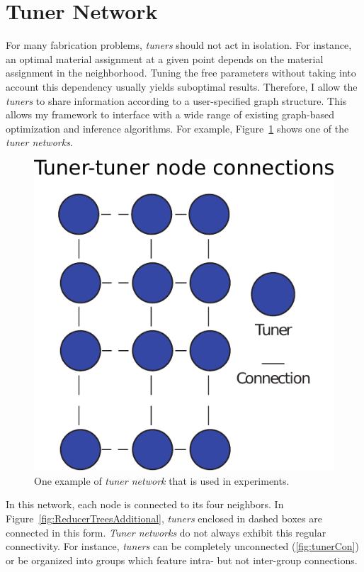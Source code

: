 \section{Tuner Network}
\label{sec:TunerNetwork}
For many fabrication problems, \emph{tuners} should not act in isolation. For instance, an optimal material assignment at a given point depends on the material assignment in the neighborhood. Tuning the free parameters without taking into account this dependency usually yields suboptimal results. Therefore, I allow the \emph{tuners} to share information according to a user-specified graph structure. This allows my framework to interface with a wide range of existing graph-based optimization and inference algorithms. For example, Figure~\ref{fig:tunerNet} shows one of the \emph{tuner networks}.

\begin{figure}[h]
\centering
\includegraphics[scale=0.45]{figure/tunerNet.pdf}
\caption{ 
	One example of \emph{tuner network} that is used in experiments.}
\label{fig:tunerNet}
\end{figure}

In this network, each node is connected to its four neighbors. In Figure~\ref{fig:ReducerTreesAdditional}, \emph{tuners} enclosed in dashed boxes are connected in this form.
\emph{Tuner networks} do not always exhibit this regular connectivity.
For instance, \emph{tuners} can be completely unconnected (\autoref{fig:tunerCon}) or be organized into groups which feature intra- but not inter-group connections.

